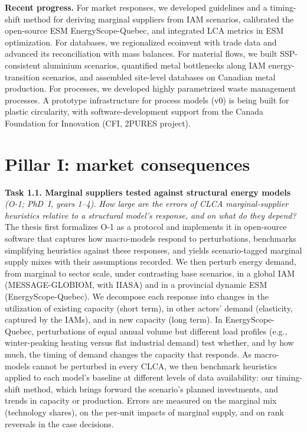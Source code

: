 \documentclass[compact]{nserc} %
\begin{document}
\noindent \textbf{Recent progress.} For market responses, we developed guidelines and a timing-shift method for deriving marginal suppliers from IAM scenarios, calibrated the open-source ESM EnergyScope-Quebec, and integrated LCA metrics in ESM optimization. For databases, we regionalized ecoinvent with trade data and advanced its reconciliation with mass balances. For material flows, we built SSP-consistent aluminium scenarios, quantified metal bottlenecks along IAM energy-transition scenarios, and assembled site-level databases on Canadian metal production. For processes, we developed highly parametrized waste management processes. A prototype infrastructure for process models (v0) is being built for plastic circularity, with software-development support from the Canada Foundation for Innovation (CFI, 2PURES project).

\section{Pillar I: market consequences}

\noindent \textbf{Task 1.1. Marginal suppliers tested against structural energy models} \emph{(O-1; PhD~I, years 1--4).} \emph{How large are the errors of CLCA marginal-supplier heuristics relative to a structural model's response, and on what do they depend?} %
%
The thesis first formalizes O-1 as a protocol and implements it in open-source software that captures how macro-models respond to perturbations, benchmarks simplifying heuristics against these responses, and yields scenario-tagged marginal supply mixes with their assumptions recorded. We then perturb energy demand, from marginal to sector scale, under contrasting base scenarios, in a global IAM (MESSAGE-GLOBIOM, with IIASA) and in a provincial dynamic ESM (EnergyScope-Quebec). We decompose each response into changes in the utilization of existing capacity (short term), in other actors' demand (elasticity, captured by the IAMs), and in new capacity (long term). In EnergyScope-Quebec, perturbations of equal annual volume but different load profiles (e.g., winter-peaking heating versus flat industrial demand) test whether, and by how much, the timing of demand changes the capacity that responds. As macro-models cannot be perturbed in every CLCA, we then benchmark heuristics applied to each model's baseline at different levels of data availability: our timing-shift method, which brings forward the scenario's planned investments, and trends in capacity or production. Errors are measured on the marginal mix (technology shares), on the per-unit impacts of marginal supply, and on rank reversals in the case decisions.
\end{document}
